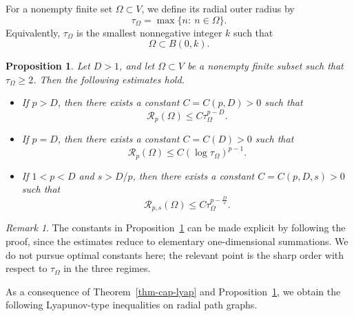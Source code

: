 \documentclass[twoside,12pt,letter]{article}
\theoremstyle{plain}
\newtheorem{proposition}[theorem]{Proposition}
\theoremstyle{definition}
\theoremstyle{remark}
\newtheorem{remark}[theorem]{Remark}
\numberwithin{equation}{section}
\begin{document}
For a nonempty finite set \(\Omega\subset V\), we define its radial outer
radius by
\[
\tau_\Omega=\max\{n:\ n\in\Omega\}.
\]
Equivalently, \(\tau_\Omega\) is the smallest nonnegative integer \(k\) such
that
\[
\Omega\subset B(0,k).
\]

\begin{proposition}\label{prop-radial-path-cap-scales}
Let \(D>1\), and let \(\Omega\subset V\) be a nonempty finite subset such that
\(\tau_\Omega\ge 2\). Then the following estimates hold.
\begin{itemize}
\item[{\rm(i)}] If \(p>D\), then there exists a constant \(C=C(p,D)>0\) such that
\begin{equation}\label{est-cap1}
\mathcal{R}_p(\Omega)\le C \tau_\Omega^{p-D}.
\end{equation}

\item[{\rm(ii)}] If \(p=D\), then there exists a constant \(C=C(D)>0\) such that
\begin{equation}\label{est-cap2}
\mathcal{R}_p(\Omega)\le C(\log \tau_\Omega)^{p-1}.
\end{equation}

\item[{\rm(iii)}] If \(1<p<D\) and \(s>D/p\), then there exists a constant
\(C=C(p,D,s)>0\) such that
\begin{equation}\label{est-cap3}
\mathcal{R}_{p,s}(\Omega)\le C \tau_\Omega^{p-\frac{D}{s}}.
\end{equation}
\end{itemize}
\end{proposition}

\begin{remark}
The constants in Proposition~\ref{prop-radial-path-cap-scales} can be made
explicit by following the proof, since the estimates reduce to elementary
one-dimensional summations. We do not pursue optimal constants here; the
relevant point is the sharp order with respect to \(\tau_\Omega\) in the three
regimes.
\end{remark}

As a consequence of Theorem~\ref{thm-cap-lyap} and
Proposition~\ref{prop-radial-path-cap-scales}, we obtain the following
Lyapunov-type inequalities on radial path graphs.
\end{document}
